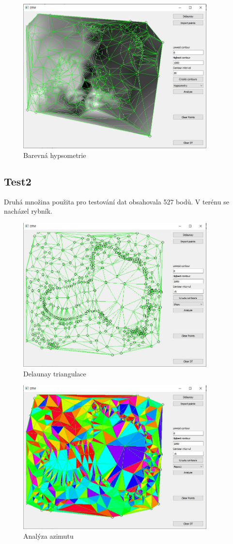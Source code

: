\documentclass[a4paper, 12pt]{article}
\begin{document}
 \begin{figure}[h!]
	\centering
	\includegraphics[width=10cm]{test15.jpg}
	\caption{Barevná hypsometrie}
\end{figure}

\clearpage

\subsection{Test2}
Druhá množina použita pro testování dat obsahovala 527 bodů. V terénu se nacházel rybník.

 \begin{figure}[h!]
	\centering
	\includegraphics[width=10cm]{test21.jpg}
	\caption{Delaunay triangulace}
\end{figure}

 \begin{figure}[h!]
	\centering
	\includegraphics[width=10cm]{test22.jpg}
	\caption{Analýza azimutu}
\end{figure}
\end{document}
